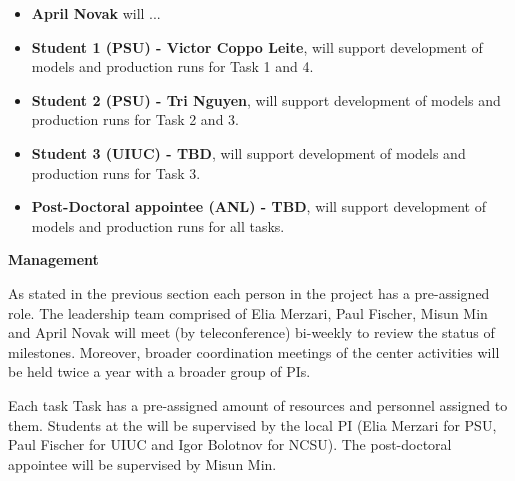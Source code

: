 \documentclass[11pt,letterpaper,english]{article}
\begin{document}
\begin{flushleft}
\begin{itemize}
\item \textbf{April Novak} will ...
\item \textbf{Student 1 (PSU) - Victor Coppo Leite}, will support development of models and production runs for Task 1 and 4.
\item \textbf{Student 2 (PSU) - Tri Nguyen}, will support development of models and production runs for Task 2 and 3.
\item \textbf{Student 3 (UIUC) - TBD}, will support development of models and production runs for Task 3.
\item \textbf{Post-Doctoral appointee (ANL) - TBD}, will support development of models and production runs for all tasks.
\end{itemize}

{\noindent \bf  {Management}}

As stated in the previous section each person in the project has a pre-assigned role. The leadership team comprised of Elia Merzari, Paul Fischer, Misun Min and April Novak will meet (by teleconference) bi-weekly to review the status of milestones.  Moreover, broader coordination meetings of the center activities will be held twice a year with a broader group of PIs.

Each task Task has a pre-assigned amount of resources and personnel assigned to them. Students at the  will be supervised by the local PI (Elia Merzari for PSU, Paul Fischer for UIUC and Igor Bolotnov for NCSU). The post-doctoral appointee will be supervised by Misun Min.

\end{flushleft}
\end{document}
